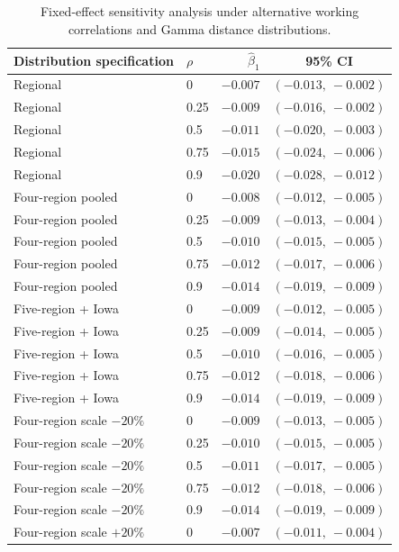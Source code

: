 \documentclass[11pt]{article}
\begin{document}
\begin{landscape}
\begin{table}[p]
\centering
\scriptsize
\caption{Fixed-effect sensitivity analysis under alternative working correlations and Gamma distance distributions.}\label{tab:supp_afo_fixed_sensitivity}
\begin{tabular}{llrr}
\toprule
Distribution specification & $\rho$ & $\hat\beta_1$ & \multicolumn{1}{c}{95\% CI} \\
\midrule
Regional & 0 & $-0.007$ & $(-0.013,\ -0.002)$ \\
Regional & 0.25 & $-0.009$ & $(-0.016,\ -0.002)$ \\
Regional & 0.5 & $-0.011$ & $(-0.020,\ -0.003)$ \\
Regional & 0.75 & $-0.015$ & $(-0.024,\ -0.006)$ \\
Regional & 0.9 & $-0.020$ & $(-0.028,\ -0.012)$ \\
Four-region pooled & 0 & $-0.008$ & $(-0.012,\ -0.005)$ \\
Four-region pooled & 0.25 & $-0.009$ & $(-0.013,\ -0.004)$ \\
Four-region pooled & 0.5 & $-0.010$ & $(-0.015,\ -0.005)$ \\
Four-region pooled & 0.75 & $-0.012$ & $(-0.017,\ -0.006)$ \\
Four-region pooled & 0.9 & $-0.014$ & $(-0.019,\ -0.009)$ \\
Five-region + Iowa & 0 & $-0.009$ & $(-0.012,\ -0.005)$ \\
Five-region + Iowa & 0.25 & $-0.009$ & $(-0.014,\ -0.005)$ \\
Five-region + Iowa & 0.5 & $-0.010$ & $(-0.016,\ -0.005)$ \\
Five-region + Iowa & 0.75 & $-0.012$ & $(-0.018,\ -0.006)$ \\
Five-region + Iowa & 0.9 & $-0.014$ & $(-0.019,\ -0.009)$ \\
Four-region scale $-20\%$ & 0 & $-0.009$ & $(-0.013,\ -0.005)$ \\
Four-region scale $-20\%$ & 0.25 & $-0.010$ & $(-0.015,\ -0.005)$ \\
Four-region scale $-20\%$ & 0.5 & $-0.011$ & $(-0.017,\ -0.005)$ \\
Four-region scale $-20\%$ & 0.75 & $-0.012$ & $(-0.018,\ -0.006)$ \\
Four-region scale $-20\%$ & 0.9 & $-0.014$ & $(-0.019,\ -0.009)$ \\
Four-region scale $+20\%$ & 0 & $-0.007$ & $(-0.011,\ -0.004)$ \\

\end{tabular}
\end{table}
\end{landscape}
\end{document}
